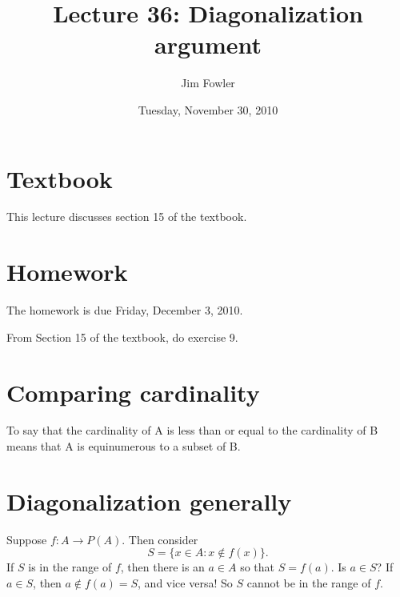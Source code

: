 \documentclass[12pt]{handout}
\title{Lecture 36: Diagonalization argument}
\author{Jim Fowler}
\date{Tuesday, November 30, 2010}
\begin{document}
\maketitle

\section*{Textbook}

This lecture discusses section 15 of the textbook.

\section*{Homework} 

The homework is due Friday, December  3, 2010.

From Section 15 of the textbook, do exercise 9.

\section*{Comparing cardinality}

To say that the cardinality of A is less than or equal to the cardinality of B
means that A is equinumerous to a subset of B.

\section*{Diagonalization generally}

Suppose $f : A \to P(A)$.  Then consider
$$
S = \{ x \in A : x \not\in f(x) \}.
$$
If $S$ is in the range of $f$, then there is an $a \in A$ so that $S =
f(a)$.  Is $a \in S$?  If $a \in S$, then $a \not\in f(a) = S$, and
vice versa!  So $S$ cannot be in the range of $f$.
\end{document}
